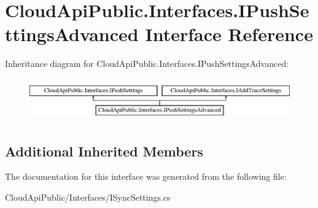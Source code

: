 \hypertarget{interface_cloud_api_public_1_1_interfaces_1_1_i_push_settings_advanced}{\section{Cloud\-Api\-Public.\-Interfaces.\-I\-Push\-Settings\-Advanced Interface Reference}
\label{interface_cloud_api_public_1_1_interfaces_1_1_i_push_settings_advanced}
}
Inheritance diagram for Cloud\-Api\-Public.\-Interfaces.\-I\-Push\-Settings\-Advanced\-:\begin{figure}[H]
\begin{center}
\leavevmode
\includegraphics[height=1.842105cm]{interface_cloud_api_public_1_1_interfaces_1_1_i_push_settings_advanced}
\end{center}
\end{figure}
\subsection*{Additional Inherited Members}


The documentation for this interface was generated from the following file\-:\begin{DoxyCompactItemize}
\item 
Cloud\-Api\-Public/\-Interfaces/I\-Sync\-Settings.\-cs\end{DoxyCompactItemize}

